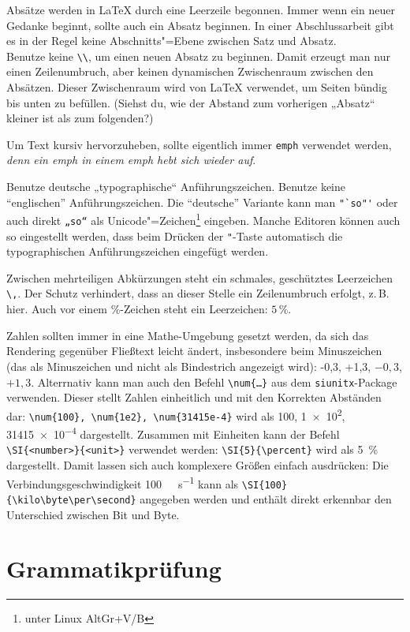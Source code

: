 Absätze werden in \LaTeX{} durch eine Leerzeile begonnen.
Immer wenn ein neuer Gedanke beginnt, sollte auch ein Absatz beginnen.
In einer Abschlussarbeit gibt es in der Regel keine Abschnitts"=Ebene zwischen Satz und Absatz.\\
Benutze keine \verb|\\|, um einen neuen Absatz zu beginnen.
Damit erzeugt man nur einen Zeilenumbruch, aber keinen dynamischen Zwischenraum zwischen den Absätzen.
Dieser Zwischenraum wird von \LaTeX{} verwendet, um Seiten bündig bis unten zu befüllen.
(Siehst du, wie der Abstand zum vorherigen „Absatz“ kleiner ist als zum folgenden?)

Um Text kursiv hervorzuheben, sollte eigentlich immer \verb|emph| verwendet werden, \emph{denn ein emph \emph{in einem emph} hebt sich wieder auf}.

Benutze deutsche „typographische“ Anführungszeichen.
Benutze keine ``englischen'' Anführungszeichen.
Die "`deutsche"' Variante kann man \verb|"`so"'| oder auch direkt \verb|„so“| als Unicode"=Zeichen\footnote{unter Linux AltGr+V/B} eingeben.
Manche Editoren können auch so eingestellt werden, dass beim Drücken der \verb|"|-Taste automatisch die typographischen Anführungszeichen eingefügt werden.

Zwischen mehrteiligen Abkürzungen steht ein schmales, geschütztes Leerzeichen \verb|\,|. Der Schutz verhindert, dass an dieser Stelle ein Zeilenumbruch erfolgt, z.\,B. hier.
Auch vor einem \%-Zeichen steht ein Leerzeichen: $5\,\%$.

Zahlen sollten immer in eine Mathe-Umgebung gesetzt werden, da sich das Rendering gegenüber Fließtext leicht ändert, insbesondere beim Minuszeichen (das als Minuszeichen und nicht als Bindestrich angezeigt wird): -0,3, +1,3, $-0,3$, $+1,3$.
Alterrnativ kann man auch den Befehl \verb|\num{…}| aus dem \verb|siunitx|-Package verwenden. Dieser stellt Zahlen einheitlich und mit den Korrekten Abständen dar:
\verb|\num{100}, \num{1e2}, \num{31415e-4}| wird als \num{100}, \num{1e2}, \num{31415e-4} dargestellt.
Zusammen mit Einheiten kann der Befehl \verb|\SI{<number>}{<unit>}| verwendet werden: \verb|\SI{5}{\percent}| wird als \SI{5}{\percent} dargestellt.
Damit lassen sich auch komplexere Größen einfach ausdrücken: Die Verbindungsgeschwindigkeit \SI{100}{\kilo\byte\per\second} kann als \verb|\SI{100}{\kilo\byte\per\second}| angegeben werden und enthält direkt erkennbar den Unterschied zwischen Bit und Byte.

\section{Grammatikprüfung}

